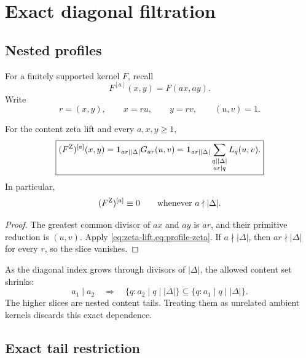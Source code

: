 \section{Exact diagonal filtration}
\label{sec:diagonal-filtration}

\subsection{Nested profiles}

For a finitely supported kernel \(F\), recall
\[
 F^{[a]}(x,y)=F(ax,ay).
\]
Write
\[
 r=(x,y),\qquad x=ru,\qquad y=rv,\qquad(u,v)=1.
\]

\begin{theorem}
\label{thm:diagonal-filtration}
For the content zeta lift and every \(a,x,y\ge1\),
\begin{equation}
 \boxed{
 (F^{\rm Z})^{[a]}(x,y)
 =
 \mathbf 1_{ar\mid|\Delta|}
 G_{ar}(u,v)
 =
 \mathbf 1_{ar\mid|\Delta|}
 \sum_{\substack{q\mid|\Delta|\\ar\mid q}}L_q(u,v).}
 \label{eq:diagonal-filtration}
\end{equation}
In particular,
\begin{equation}
 (F^{\rm Z})^{[a]}\equiv0
 \qquad\text{whenever }a\nmid|\Delta|.
 \label{eq:nondivisor-slices-vanish}
\end{equation}
\end{theorem}

\begin{proof}
The greatest common divisor of \(ax\) and \(ay\) is \(ar\), and their
primitive reduction is \((u,v)\).  Apply
\cref{eq:zeta-lift,eq:profile-zeta}.  If \(a\nmid|\Delta|\), then
\(ar\nmid|\Delta|\) for every \(r\), so the slice vanishes.
\end{proof}

\begin{remark}
As the diagonal index grows through divisors of \(|\Delta|\), the allowed
content set shrinks:
\[
 a_1\mid a_2
 \quad\Longrightarrow\quad
 \{q:a_2\mid q\mid|\Delta|\}
 \subseteq
 \{q:a_1\mid q\mid|\Delta|\}.
\]
The higher slices are nested content tails.  Treating them as unrelated
ambient kernels discards this exact dependence.
\end{remark}

\subsection{Exact tail restriction}

